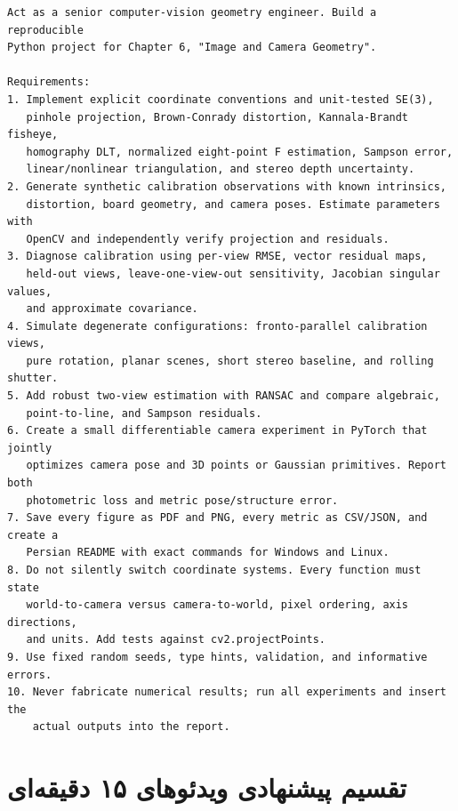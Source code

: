 \documentclass[12pt,openany,oneside]{book}
\begin{document}
\begin{latin}
\begin{lstlisting}[language={}]
Act as a senior computer-vision geometry engineer. Build a reproducible
Python project for Chapter 6, "Image and Camera Geometry".

Requirements:
1. Implement explicit coordinate conventions and unit-tested SE(3),
   pinhole projection, Brown-Conrady distortion, Kannala-Brandt fisheye,
   homography DLT, normalized eight-point F estimation, Sampson error,
   linear/nonlinear triangulation, and stereo depth uncertainty.
2. Generate synthetic calibration observations with known intrinsics,
   distortion, board geometry, and camera poses. Estimate parameters with
   OpenCV and independently verify projection and residuals.
3. Diagnose calibration using per-view RMSE, vector residual maps,
   held-out views, leave-one-view-out sensitivity, Jacobian singular values,
   and approximate covariance.
4. Simulate degenerate configurations: fronto-parallel calibration views,
   pure rotation, planar scenes, short stereo baseline, and rolling shutter.
5. Add robust two-view estimation with RANSAC and compare algebraic,
   point-to-line, and Sampson residuals.
6. Create a small differentiable camera experiment in PyTorch that jointly
   optimizes camera pose and 3D points or Gaussian primitives. Report both
   photometric loss and metric pose/structure error.
7. Save every figure as PDF and PNG, every metric as CSV/JSON, and create a
   Persian README with exact commands for Windows and Linux.
8. Do not silently switch coordinate systems. Every function must state
   world-to-camera versus camera-to-world, pixel ordering, axis directions,
   and units. Add tests against cv2.projectPoints.
9. Use fixed random seeds, type hints, validation, and informative errors.
10. Never fabricate numerical results; run all experiments and insert the
    actual outputs into the report.
\end{lstlisting}
\end{latin}

\section{تقسیم پیشنهادی ویدئوهای ۱۵ دقیقه‌ای}
\end{document}
